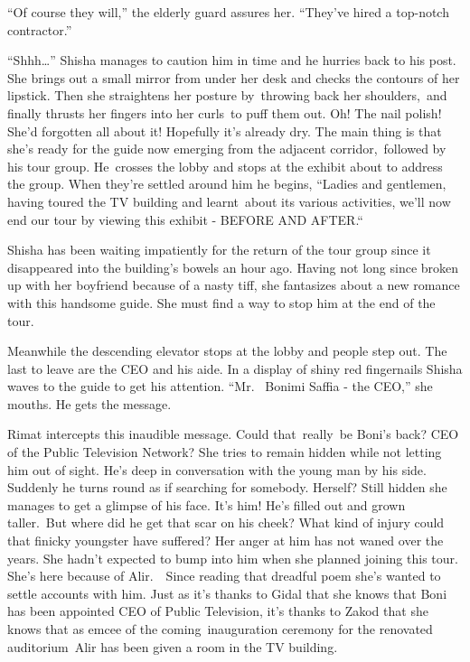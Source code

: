\documentclass[twoside,11pt]{book}
\begin{document}
``Of course they will,'' the elderly guard assures her. ``They've hired a
top-notch contractor.''

``Shhh{\dots}'' Shisha manages to caution him in time and he hurries back to his post. She
brings out a small mirror from under her desk and checks the contours of her lipstick. Then she straightens her posture
by{\ }throwing back her shoulders,\ and finally thrusts her fingers into her curls~to puff them out. Oh!
The nail polish! She'd forgotten all about it! Hopefully it's already dry. The main thing is that she's ready for the
guide now emerging from the adjacent corridor,~followed by his tour group. He~crosses the lobby and stops at the
exhibit about to address the group. When they're settled around him he begins, ``Ladies and gentlemen,
having toured the TV building and learnt\ about its various activities, we'll now end our tour by viewing this exhibit
- BEFORE AND AFTER.``\ 

Shisha has been waiting impatiently for the return of the tour group since it disappeared into the building's bowels an
hour ago. Having not long since broken up with her boyfriend because of a nasty tiff, she fantasizes about a new
romance with this handsome guide. She must find a way to stop him at the end of the tour. 

Meanwhile the descending elevator stops at the lobby and people step out. The last to leave are the CEO and his aide. In
a display of shiny red fingernails Shisha waves to the guide to get his attention. ``Mr. ~Bonimi Saffia -
the CEO,'' she mouths. He gets the message. 

Rimat intercepts this inaudible message. Could that~really~be Boni's back? CEO of the Public Television Network? She
tries to remain hidden while not letting him out of sight. He's deep in conversation with the young man by his side.
Suddenly he turns round as if searching for somebody. Herself? Still hidden she manages to get a glimpse of his face.
It's him! He{}'s filled out and grown taller.\ But where did he get that scar on his cheek? What kind of injury could
that finicky youngster have suffered? Her anger at him has not waned over the years. She hadn't expected to bump into
him when she planned joining this tour{.} She's here because of
Alir.\ \ Since reading that dreadful poem she's wanted to settle accounts with him. Just as it's thanks to Gidal that
she knows that Boni has been appointed CEO of Public Television, it's thanks to Zakod that she knows that as emcee of
the coming{\ }inauguration ceremony for the renovated auditorium\ Alir
has been given a room in the TV building. 
\end{document}
